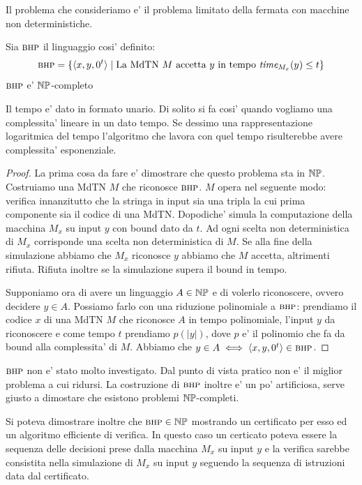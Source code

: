 Il problema che consideriamo e' il problema limitato della fermata con macchine non deterministiche.

\begin{thm}
    Sia $\textsc{bhp}$ il linguaggio cosi' definito:
    \begin{equation*}
        \textsc{bhp} = \{\langle x,y,0^{t} \rangle \mid \text{La MdTN $M$ accetta $y$ in tempo
        $\textit{time}_{M_{x}}(y) \leq t$}\}
    \end{equation*}
    $\textsc{bhp}$ e' $\mathbb{NP}$-completo
\end{thm}

Il tempo e' dato in formato unario. Di solito si fa cosi' quando vogliamo una complessita' lineare
in un dato tempo.  Se dessimo una rappresentazione logaritmica del tempo l'algoritmo che lavora con
quel tempo risulterebbe avere complessita' esponenziale.

\begin{proof}
    La prima cosa da fare e' dimostrare che questo problema sta in $\mathbb{NP}$. Costruiamo una MdTN
    $M$ che riconosce $\textsc{bhp}$. $M$ opera nel seguente modo: verifica innanzitutto che la stringa in
    input sia una tripla la cui prima componente sia il codice di una MdTN. Dopodiche' simula la
    computazione della macchina $M_{x}$ su input $y$ con bound dato da $t$. Ad ogni scelta non
    deterministica di $M_{x}$ corrisponde una scelta non deterministica di $M$. Se alla fine della
    simulazione abbiamo che $M_{x}$ riconosce $y$ abbiamo che $M$ accetta, altrimenti rifiuta.
    Rifiuta inoltre se la simulazione supera il bound in tempo. 
    
    Supponiamo ora di avere un linguaggio $A \in \mathbb{NP}$ e di volerlo riconoscere, ovvero decidere
    $y \in A$.  Possiamo farlo con una riduzione polinomiale a $\textsc{bhp}$: prendiamo il codice $x$ di
    una MdTN $M$ che riconosce $A$ in tempo polinomiale, l'input $y$ da riconoscere e come tempo $t$
    prendiamo $p(|y|)$, dove $p$ e' il polinomio che fa da bound alla complessita' di $M$. Abbiamo
    che $y \in A \iff \langle x,y,0^{t} \rangle \in \textsc{bhp}$.
\end{proof}

$\textsc{bhp}$ non e' stato molto investigato. Dal punto di vista pratico non e' il miglior problema a cui
ridursi. La costruzione di $\textsc{bhp}$ inoltre e' un po' artificiosa, serve giusto a dimostare che
esistono problemi $\mathbb{NP}$-completi.

Si poteva dimostrare inoltre che $\textsc{bhp} \in \mathbb{NP}$ mostrando un certificato per esso ed un
algoritmo efficiente di verifica. In questo caso un certicato poteva essere la sequenza delle
decisioni prese dalla macchina $M_{x}$ su input $y$ e la verifica sarebbe consistita nella
simulazione di $M_{x}$ su input $y$ seguendo la sequenza di istruzioni data dal certificato.
